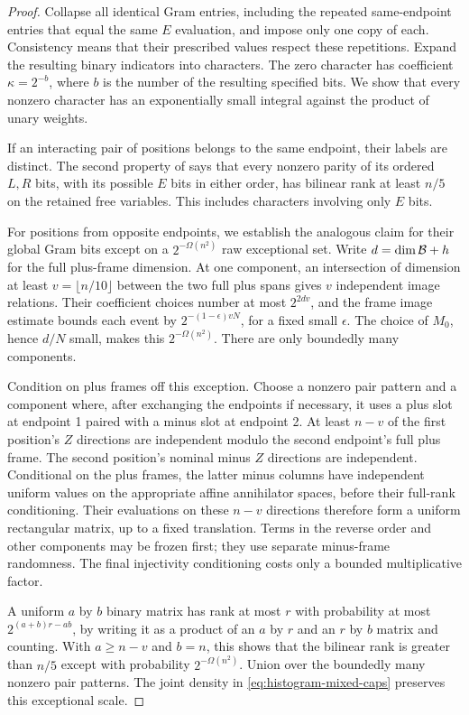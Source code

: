 \begin{proof}
Collapse all identical Gram entries, including the repeated
same-endpoint entries that equal the same $E$ evaluation, and impose
only one copy of each. Consistency means that their prescribed values
respect these repetitions. Expand the resulting binary indicators
into characters. The zero character has coefficient $\kappa=2^{-b}$,
where $b$ is the number of the resulting specified bits. We show that
every nonzero character has an exponentially small integral against
the product of unary weights.

If an interacting pair of positions belongs to the same endpoint,
their labels are distinct. The second property of
 says that every nonzero parity of its ordered
$L,R$ bits, with its possible $E$ bits in either order, has bilinear
rank at least $n/5$ on the retained free variables. This includes
characters involving only $E$ bits.

For positions from opposite endpoints, we establish the analogous
claim for their global Gram bits except on a
$2^{-\Omega(n^2)}$ raw exceptional set. Write $d=\dim\mathcal B+h$ for the
full plus-frame dimension. At one component, an intersection of
dimension at least $v=\lfloor n/10\rfloor$ between the two full plus
spans gives $v$ independent image relations. Their coefficient
choices number at most $2^{2dv}$, and the frame image estimate bounds
each event by $2^{-(1-\epsilon)vN}$, for a fixed small $\epsilon$.
The choice of $M_0$, hence $d/N$ small, makes this
$2^{-\Omega(n^2)}$. There are only boundedly many components.

Condition on plus frames off this exception. Choose a nonzero pair
pattern and a component where, after exchanging the endpoints if
necessary, it uses a plus slot at endpoint 1 paired with a minus slot
at endpoint 2. At least $n-v$ of the first position's $Z$ directions
are independent modulo the second endpoint's full plus frame. The
second position's nominal minus $Z$ directions are independent.
Conditional on the plus frames, the latter minus columns have
independent uniform values on the appropriate affine annihilator
spaces, before their full-rank conditioning. Their evaluations on
these $n-v$ directions therefore form a uniform rectangular matrix,
up to a fixed translation. Terms in the reverse order and other
components may be frozen first; they use separate minus-frame
randomness. The final injectivity conditioning costs only a bounded
multiplicative factor.

A uniform $a$ by $b$ binary matrix has rank at most $r$ with
probability at most $2^{(a+b)r-ab}$, by writing it as a product of an
$a$ by $r$ and an $r$ by $b$ matrix and counting. With
$a\ge n-v$ and $b=n$, this shows that the bilinear rank is greater
than $n/5$ except with probability $2^{-\Omega(n^2)}$. Union over the
boundedly many nonzero pair patterns. The joint density in
\eqref{eq:histogram-mixed-caps} preserves this exceptional scale.


\end{proof}
